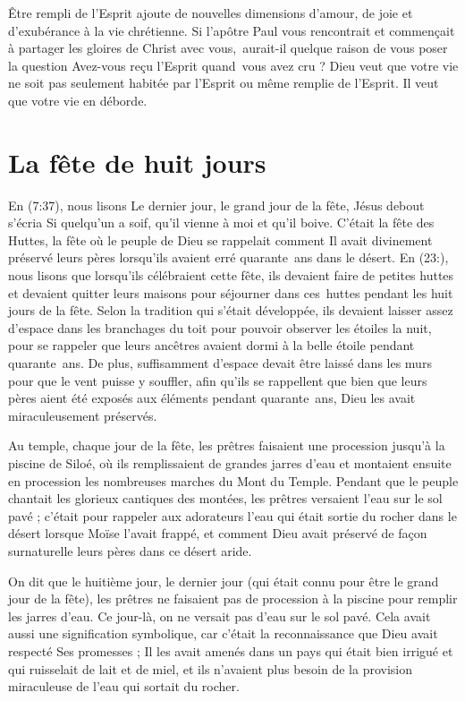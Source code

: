 Être rempli de l'Esprit ajoute de nouvelles dimensions d'amour,
 de joie et d'exubérance à la vie chrétienne.
 Si l'apôtre Paul vous rencontrait et commençait à partager les gloires
 de Christ avec vous,~aurait-il quelque raison de vous poser la question\frcolon{}
 \Og Avez-vous reçu l'Esprit quand~vous avez cru ? \Fg{}
 Dieu veut que votre vie ne soit pas seulement habitée
 par l'Esprit ou même remplie de l'Esprit.
 Il veut que votre vie en déborde.


\section{La f\^ete de huit jours}

En (7:37), nous lisons\frcolon{}
 \Og Le dernier jour, le grand jour de la fête, Jésus debout s'écria\frcolon{}
 Si quelqu'un a soif, qu'il vienne à moi et qu'il boive. \Fg{}
 C'était la fête des Huttes, la fête où le peuple de Dieu se rappelait
 comment Il avait divinement préservé leurs pères lorsqu'ils avaient erré
 quarante~ans dans le désert.
 En (23:), nous lisons que lorsqu'ils célébraient cette fête,
 ils devaient faire de petites huttes et devaient quitter leurs maisons
 pour séjourner dans ces~huttes pendant les huit jours de la fête.
 Selon la tradition qui s'était développée, ils devaient laisser assez d'espace
 dans les branchages du toit pour pouvoir observer les étoiles la nuit,
 pour se rappeler que leurs ancêtres avaient dormi à la belle étoile
 pendant quarante~ans. De plus, suffisamment d'espace devait être laissé
 dans les murs pour que le vent puisse y souffler, afin qu'ils se rappellent
 que bien que leurs pères aient été exposés aux éléments pendant quarante~ans,
 Dieu les avait miraculeusement préservés.

Au temple, chaque jour de la fête, les prêtres faisaient une procession
 jusqu'à la piscine de Siloé, où ils remplissaient de grandes jarres d'eau
 et montaient ensuite en procession les nombreuses marches du Mont du Temple.
 Pendant que le peuple chantait les glorieux cantiques des montées,
 les prêtres versaient l'eau sur le sol pavé ; c'était pour rappeler
 aux adorateurs l'eau qui était sortie du rocher dans le désert lorsque Moïse
 l'avait frappé, et comment Dieu avait préservé de façon surnaturelle
 leurs pères dans ce désert aride. 

On dit que le huitième jour, le dernier jour (qui était connu pour être
 le grand jour de la fête), les prêtres ne faisaient pas de procession
 à la piscine pour remplir les jarres d'eau.
 Ce jour-là, on ne versait pas d'eau sur le sol pavé.
 Cela avait aussi une signification symbolique, car c'était la reconnaissance
 que Dieu avait respecté Ses promesses ; Il les avait amenés dans un pays
 qui était bien irrigué et qui ruisselait de lait et de miel,
 et ils n'avaient plus besoin de la provision miraculeuse de l'eau
 qui sortait du rocher.

